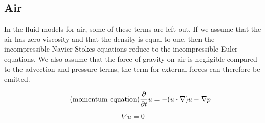 \subsection{Air}

In the fluid models for air, some of these terms are left out. If we assume that 
the air has zero viscosity and that the density is equal to one, then the 
incompressible Navier-Stokes equations reduce to the incompressible Euler 
equations. We also assume that the force of gravity on air is negligible compared 
to the advection and pressure terms, the term for external forces can therefore be 
emitted. 

\begin{equation} 
	\tag{momentum equation}
	\frac{\partial}{\partial t}u  = -(u \cdot \nabla)u - \nabla p
\end{equation}

\begin{equation}
	\tag{continuity equation}
	\nabla u = 0
\end{equation}
